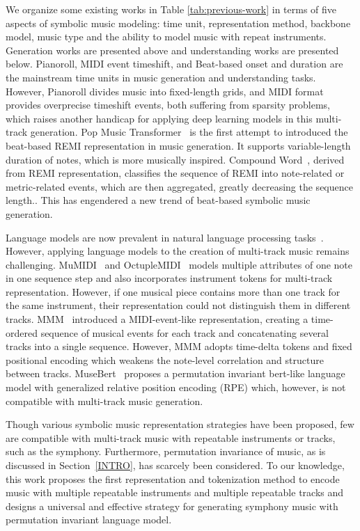 \documentclass{article}
\begin{document}
We organize some existing works in Table \ref{tab:previous-work} in terms of five aspects of symbolic music modeling: time unit, representation method, backbone model,  music type and the ability to model music with repeat instruments. Generation works are presented above and understanding works are presented below. Pianoroll, MIDI event timeshift, and Beat-based onset and duration are the mainstream time units in music generation and understanding tasks. However, Pianoroll divides music into fixed-length grids, and MIDI format provides overprecise timeshift events, both suffering from sparsity problems, which raises another handicap for applying deep learning models in this multi-track generation.
Pop Music Transformer~\cite{popmt} is the first attempt to introduced the beat-based REMI representation in music generation. It supports variable-length duration of notes, which is more musically inspired. Compound Word~\cite{cwt}, derived from REMI representation, classifies the sequence of REMI into note-related or metric-related events, which are then aggregated, greatly decreasing the sequence length.. This has engendered a new trend of beat-based symbolic music generation. 

Language models are now prevalent in natural language processing tasks~\cite{brown2020language}. However, applying language models to the creation of multi-track music remains challenging.
MuMIDI~\cite{popmag} and OctupleMIDI~\cite{musicbert} models multiple attributes of one note in one sequence step and also incorporates instrument tokens for multi-track representation. However, if one musical piece contains more than one track for the same instrument, their representation could not distinguish them in different tracks. MMM~\cite{mmm} introduced a MIDI-event-like representation, creating a time-ordered sequence of musical events for each track and concatenating several tracks into a single sequence. However, MMM adopts time-delta tokens and fixed positional encoding which weakens the note-level correlation and structure between tracks. MuseBert~\cite{musebert} proposes a permutation invariant bert-like language model with generalized relative position encoding (RPE) which, however, is not compatible with multi-track music generation.


Though various symbolic music representation strategies have been proposed, few are compatible with multi-track music with repeatable instruments or tracks, such as the symphony. Furthermore, permutation invariance of music, as is discussed in Section~\ref{INTRO}, has scarcely been considered. To our knowledge, this work proposes the first representation and tokenization method to encode music with multiple repeatable instruments and multiple repeatable tracks and designs a universal and effective strategy for generating symphony music with permutation invariant language model.
\end{document}

